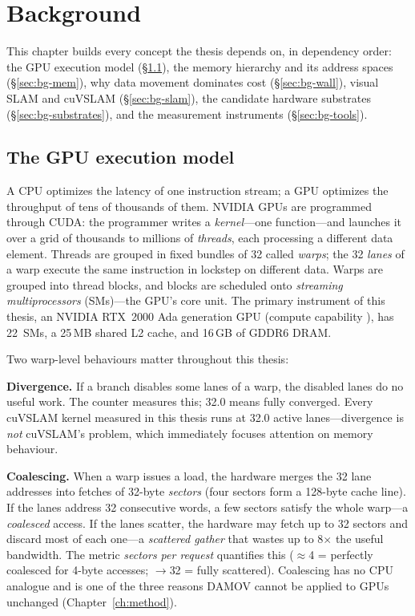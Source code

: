 \chapter{Background}
\label{ch:background}

This chapter builds every concept the thesis depends on, in dependency
order: the GPU execution model (\S\ref{sec:bg-gpu}), the memory hierarchy and
its address spaces (\S\ref{sec:bg-mem}), why data movement dominates cost
(\S\ref{sec:bg-wall}), visual SLAM and cuVSLAM (\S\ref{sec:bg-slam}), the
candidate hardware substrates (\S\ref{sec:bg-substrates}), and the
measurement instruments (\S\ref{sec:bg-tools}).

\section{The GPU execution model}
\label{sec:bg-gpu}

A CPU optimizes the latency of one instruction stream; a GPU optimizes the
throughput of tens of thousands of them. NVIDIA GPUs are programmed through
CUDA: the programmer writes a \emph{kernel}---one function---and launches it
over a grid of thousands to millions of \emph{threads}, each processing a
different data element. Threads are grouped in fixed bundles of 32 called
\emph{warps}; the 32 \emph{lanes} of a warp execute the same instruction in
lockstep on different data. Warps are grouped into thread blocks, and blocks
are scheduled onto \emph{streaming multiprocessors} (SMs)---the GPU's core
unit. The primary instrument of this thesis, an NVIDIA RTX~2000 Ada
generation GPU (compute capability ), has 22~SMs, a 25\,MB
shared L2 cache, and 16\,GB of GDDR6 DRAM.

Two warp-level behaviours matter throughout this thesis:

\textbf{Divergence.} If a branch disables some lanes of a warp, the disabled
lanes do no useful work. The counter  measures
this; 32.0 means fully converged. Every cuVSLAM kernel measured in this
thesis runs at 32.0 active lanes---divergence is \emph{not} cuVSLAM's
problem, which immediately focuses attention on memory behaviour.

\textbf{Coalescing.} When a warp issues a load, the hardware merges the 32
lane addresses into fetches of 32-byte \emph{sectors} (four sectors form a
128-byte cache line). If the lanes address 32 consecutive words, a few
sectors satisfy the whole warp---a \emph{coalesced} access. If the lanes
scatter, the hardware may fetch up to 32 sectors and discard most of each
one---a \emph{scattered gather} that wastes up to 8$\times$ the useful
bandwidth. The metric \emph{sectors per request} quantifies this ($\approx$4
= perfectly coalesced for 4-byte accesses; $\rightarrow$32 = fully
scattered). Coalescing has no CPU analogue and is one of the three reasons
DAMOV cannot be applied to GPUs unchanged (Chapter~\ref{ch:method}).

